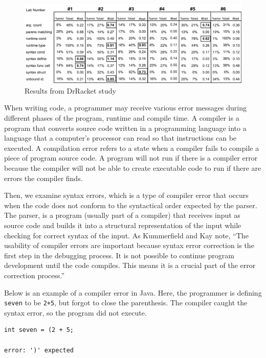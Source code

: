 \documentclass{sig-alternate}
\begin{document}
\begin{figure}\label{fig:drracketdata}
  \centering
  \includegraphics[keepaspectratio, width= 1.0 \textwidth]{MEE-Data.pdf}
  \caption{Results from DrRacket study}
  \label{fig:drracketstudy}
\end{figure}

When writing code, a programmer may receive various error messages during different phases of the program, runtime and compile time.
A compiler is a program that converts source code written in a programming language into a language that a computer's processor can read so that instructions can be executed.
A compilation error refers to a state when a compiler fails to compile a piece of  program source code.
A program will not run if there is a compiler error because the compiler will not be able to create executable code to run if there are errors the compiler finds. 

Then, we examine syntax errors, which is a type of compiler error that occurs when the code does not conform to the syntactical order expected by the parser.
The parser, is a program (usually part of a compiler) that receives input as source code and builds it into a structural representation of the input while checking for correct syntax of the input.
As Kummerfield and Kay note, ``The usability of compiler errors are important because syntax error correction is the first step in the debugging process. It is not possible to continue program development until the code compiles. This means it is a crucial part of the error correction process.''~\cite{Kummerfeld:2003:NBF:858403.858416}

Below is an example of a compiler error in Java. Here, the programmer is defining \texttt{seven} to be \texttt{2+5}, but forgot to close the parenthesis. The compiler caught the syntax error, so the program did not execute.

\begin{verbatim}
int seven = (2 + 5;

error: ')' expected
\end{verbatim}
\end{document}
